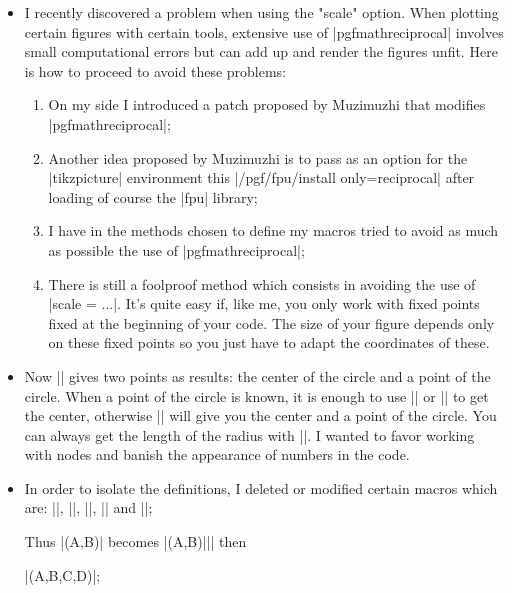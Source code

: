  \begin{itemize}\setlength{\itemsep}{10pt} 
  

\item I recently discovered a problem when using the "scale" option. When plotting certain figures with certain tools, extensive use of |pgfmathreciprocal| involves small computational errors but can add up and render the figures unfit. Here is how to proceed to avoid these problems:
\begin{enumerate}
  
  \item On my side I introduced a patch proposed by Muzimuzhi that modifies 
|pgfmathreciprocal|;

\item  Another idea proposed by Muzimuzhi is to pass as an option for the |tikzpicture| environment this |/pgf/fpu/install only={reciprocal}| after loading of course the |fpu| library;

\item I have in the methods chosen to define my macros tried to avoid as much as possible the use of |pgfmathreciprocal|;

\item  There is still a foolproof method which consists in avoiding the use of |scale = ...|. It's quite easy if, like me, you only work with fixed points fixed at the beginning of your code. The size of your figure depends only on these fixed points so you just have to adapt the coordinates of these.
\end{enumerate}

\item Now |\tkzDefCircle| gives two points as results: the center of the circle and a point of the circle. When a point of the circle is known, it is enough to use |\tkzGetPoint| or |\tkzGetFirstPoint|
to get the center, otherwise |\tkzGetPoints| will give you the center and a point of the circle. You can always get the length of the radius with |\tkzGetLength|. I wanted to favor working with nodes and banish the appearance of numbers in the code.

\item  In order to isolate the definitions, I deleted or modified certain macros which are: |\tkzDrawLine|, |\tkzDrawTriangle|, |\tkzDrawCircle|, |\tkzDrawSemiCircle| and  |\tkzDrawRectangle|;

Thus |\tkzDrawSquare(A,B)| becomes |\tkzDefSquare(A,B)||| then

 |\tkzDrawPolygon(A,B,C,D)|;


\end{itemize}
